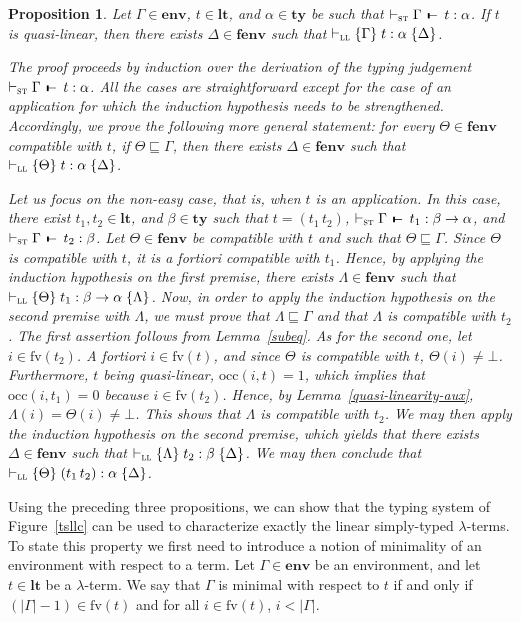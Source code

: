 \documentclass[submission,creativecommons]{eptcs}
\newtheorem{proposition}{Proposition}
\newcommand{\mybox}{\raisebox{3.5pt}{\framebox[7pt]{\rule{0mm}{0.3pt}}}}
\def\qed{\ifmmode\mybox\else{\unskip\nobreak\hfil
\penalty50\hskip1em\null\nobreak\hfil\mybox
\parfillskip=0pt\finalhyphendemerits=0\endgraf}\fi}
\newenvironment{proof}{%

\vspace{.7ex}
\noindent{\it Proof.} \rm}{\qed}
\def\joinrelm{\mathrel{\mkern-3mu}}
\def\relbar{\mathrel{\smash-}}
\def\tailpiece{\mathchoice
  {\vrule height 1ex width 0.3ex depth -.1ex}%
  {\vrule height 1ex width 0.3ex depth -.1ex}%
  {\vrule height 0.7ex width 0.3ex depth -.1ex}%
  {\vrule height 0.7ex width 0.3ex depth -.1ex}}
\def\seqsym{\mathrel{\tailpiece\joinrelm\relbar}}
\newcommand{\bt}{{\scriptstyle\bot}}
\newcommand{\iapp}[2]{(#1\,#2)}
\newcommand{\tseq}[3]{#1 \, \seqsym \, #2 : #3}
\newcommand{\tytm}[4]{\{#1\}\;#2:#3\;\{#4\}}
\newcommand{\der}[1]{\vdash_{#1}}
\newcommand{\Sst}{{\textsc{st}}}
\newcommand{\Sll}{{\textsc{ll}}}
\newcommand{\ltm}{\mathord{\mathbf{lt}}}
\newcommand{\ty}{\mathord{\mathbf{ty}}}
\newcommand{\env}{\mathord{\mathbf{env}}}
\newcommand{\fenv}{\mathord{\mathbf{fenv}}}
\newcommand{\occ}[2]{\mathord{\mathrm{occ}}(#1,#2)}
\newcommand{\fv}[1]{\mathord{\mathrm{fv}}(#1)}
\begin{document}
\begin{proposition}\label{st2ll}
Let $\Gamma\in\env$, $t\in\ltm$, and $\alpha\in\ty$ be such that $\der{\Sst}\tseq{\Gamma}{t}{\alpha}$.
If $t$ is quasi-linear, then there exists $\Delta\in\fenv$ such that
$\der{\Sll}\tytm{\Gamma}{t}{\alpha}{\Delta}$.
\begin{proof}
The proof proceeds by induction over the derivation of the typing judgement $\der{\Sst} \tseq{\Gamma}{t}{\alpha}$.
All the cases are straightforward except for the case of an application for which the induction hypothesis needs to be
strengthened. Accordingly, we prove the following more general statement: for every $\Theta \in \fenv$ compatible with $t$,
if $\Theta\sqsubseteq\Gamma$, then there exists $\Delta\in\fenv$ such that $\der{\Sll}\tytm{\Theta}{t}{\alpha}{\Delta}$.

Let us focus on the non-easy case, that is, when $t$ is an application. In this case, there exist $t_1, t_2\in\ltm$, and
$\beta\in\ty$ such that $t=\iapp{t_1}{t_2}$, $\der{\Sst}\tseq{\Gamma}{t_1}{\beta\rightarrow\alpha}$,
and $\der{\Sst}\tseq{\Gamma}{t_2}{\beta}$. Let $\Theta \in \fenv$ be compatible with $t$ and such that $\Theta\sqsubseteq\Gamma$.
Since $\Theta$ is compatible with $t$, it is a fortiori compatible with $t_1$. Hence, by applying the induction hypothesis on the
first premise, there exists $\Lambda \in \fenv$ such that $\der{\Sll}\tytm{\Theta}{t_1}{\beta\rightarrow\alpha}{\Lambda}$.
Now, in order to apply the induction hypothesis on the second premise with $\Lambda$, we must prove that
$\Lambda\sqsubseteq\Gamma$ and that $\Lambda$ is compatible with $t_2$. The first assertion follows from Lemma~\ref{subeq}.
As for the second one, let $i\in\fv{t_2}$. A fortiori $i\in\fv{t}$, and since $\Theta$ is compatible with $t$,
$\Theta(i) \not=\bt$. Furthermore, $t$ being quasi-linear, $\occ{i}{t}=1$, which implies that $\occ{i}{t_1}=0$
because $i\in\fv{t_2}$. Hence, by Lemma~\ref{quasi-linearity-aux}, $\Lambda(i) = \Theta(i) \not= \bt$.
This shows that $\Lambda$ is compatible with $t_2$. We may then apply the induction hypothesis on the second premise,
which yields that there exists $\Delta \in \fenv$ such that $\der{\Sll}\tytm{\Lambda}{t_2}{\beta}{\Delta}$.
We may then conclude that $\der{\Sll}\tytm{\Theta}{\iapp{t_1}{t_2}}{\alpha}{\Delta}$.
\end{proof}
\end{proposition}

Using the preceding three propositions, we can show that the typing system of Figure~\ref{tsllc} can be used to characterize
exactly the linear simply-typed $\lambda$-terms. To state this property we first need to introduce a notion of minimality
of an environment with respect to a term. Let $\Gamma \in \env$ be an environment, and let $t\in\ltm$ be a $\lambda$-term.
We say that $\Gamma$ is minimal with respect to $t$ if and only if $(|\Gamma|-1)\in\fv{t}$ and for all $i\in\fv{t}$, $i<|\Gamma|$.
\end{document}
